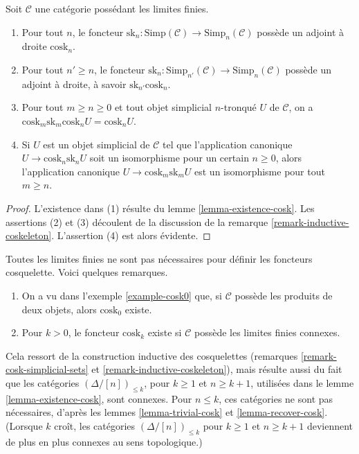 \begin{lemma}
\label{lemma-cosk-up}
Soit $\mathcal{C}$ une catégorie possédant les limites finies.
\begin{enumerate}
\item Pour tout $n$, le foncteur $\text{sk}_n : \text{Simp}(\mathcal{C})
\to \text{Simp}_n(\mathcal{C})$ possède un adjoint à droite
$\text{cosk}_n$.
\item Pour tout $n' \geq n$, le foncteur
$\text{sk}_n : \text{Simp}_{n'}(\mathcal{C}) \to \text{Simp}_n(\mathcal{C})$
possède un adjoint à droite, à savoir $\text{sk}_{n'}\text{cosk}_n$.
\item Pour tout $m \geq n \geq 0$ et tout objet simplicial $n$-tronqué
$U$ de $\mathcal{C}$, on a
$\text{cosk}_m \text{sk}_m \text{cosk}_n U = \text{cosk}_n U$.
\item Si $U$ est un objet simplicial de $\mathcal{C}$ tel que l'application
canonique
$U \to \text{cosk}_n \text{sk}_nU$
soit un isomorphisme pour un certain $n \geq 0$, alors l'application canonique
$U \to \text{cosk}_m \text{sk}_mU$
est un isomorphisme pour tout $m \geq n$.
\end{enumerate}
\end{lemma}

\begin{proof}
L'existence dans (1) résulte du lemme \ref{lemma-existence-cosk}.
Les assertions (2) et (3) découlent de la discussion de la remarque
\ref{remark-inductive-coskeleton}. L'assertion (4) est alors évidente.
\end{proof}

\begin{remark}
\label{remark-existence-cosk}
Toutes les limites finies ne sont pas nécessaires pour définir les
foncteurs cosquelette. Voici quelques remarques.
\begin{enumerate}
\item On a vu dans l'exemple \ref{example-cosk0} que, si $\mathcal{C}$
possède les produits de deux objets, alors $\text{cosk}_0$ existe.
\item Pour $k > 0$, le foncteur $\text{cosk}_k$ existe si
$\mathcal{C}$ possède les limites finies connexes.
\end{enumerate}
Cela ressort de la construction inductive des cosquelettes (remarques
\ref{remark-cosk-simplicial-sets} et
\ref{remark-inductive-coskeleton}), mais résulte aussi du fait que les
catégories $(\Delta/[n])_{\leq k}$, pour $k \geq 1$ et $n \geq k + 1$,
utilisées dans le lemme \ref{lemma-existence-cosk}, sont connexes.
Pour $n \leq k$, ces catégories ne sont pas nécessaires, d'après les
lemmes \ref{lemma-trivial-cosk} et \ref{lemma-recover-cosk}.
(Lorsque $k$ croît, les catégories $(\Delta/[n])_{\leq k}$ pour
$k \geq 1$ et $n \geq k + 1$ deviennent de plus en plus connexes au sens
topologique.)
\end{remark}

